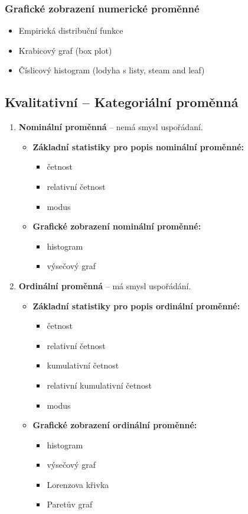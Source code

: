 \subsubsection{Grafické zobrazení numerické proměnné}
\begin{itemize}
	\item Empirická distribuční funkce
	\item Krabicový graf (box plot)
	\item Číslicový histogram (lodyha s listy, steam and leaf)
\end{itemize}

 \subsection{Kvalitativní -- Kategoriální proměnná}
\begin{enumerate}
	\item \textbf{Nominální proměnná} -- nemá smysl uspořádaní.
	\begin{itemize}
		\item \textbf{Základní statistiky pro popis nominální proměnné:}
	 		\begin{itemize}
	 			\item četnost
	 			\item relativní četnost
	 			\item modus
	 		\end{itemize}
	\item \textbf{Grafické zobrazení nominální proměnné:}
			\begin{itemize}
				\item histogram
				\item výsečový graf
			\end{itemize}
	\end{itemize}
	\item \textbf{Ordinální proměnná} -- má smysl uspořádání.
	\begin{itemize}
		\item \textbf{Základní statistiky pro popis ordinální proměnné:}
	 		\begin{itemize}
	 			\item četnost
	 			\item relativní četnost
	 			\item kumulativní četnost
	 			\item relativní kumulativní četnost
	 			\item modus
	 		\end{itemize}
		\item \textbf{Grafické zobrazení ordinální proměnné:}
				\begin{itemize}
						\item histogram
						\item výsečový graf
						\item Lorenzova křivka
						\item Paretův graf
				\end{itemize}
	\end{itemize}
\end{enumerate}

